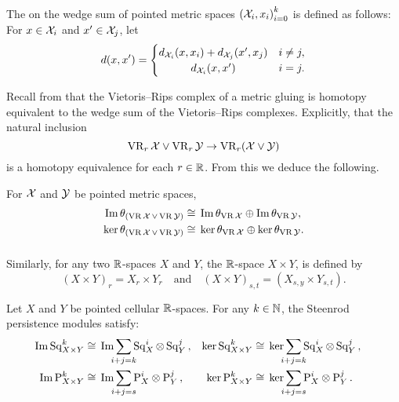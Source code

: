 \subsubsection{}\label{ss:wedge sum}

The  on the wedge sum of pointed metric spaces ${(\mathcal{X}_i, x_i)}_{i = 0}^k$ is defined as follows: For $x \in \mathcal{X}_i$ and $x' \in \mathcal{X}_j$, let
\[
d(x, x') =
\begin{cases}
	d_{\cX_i}(x, x_i) + d_{\cX_j}(x', x_j) & i \neq j, \\
	\hfil d_{\cX_i}(x, x') & i = j.
\end{cases}
\]

Recall from \cite[Proposition 1]{adamaszek2020homotopy} that the Vietoris--Rips complex of a metric gluing is homotopy equivalent to the wedge sum of the Vietoris--Rips complexes.
Explicitly, that the natural inclusion
\[
\operatorname{VR}_r\mathcal{X} \vee \operatorname{VR}_r\mathcal{Y} \to \operatorname{VR}_r(\mathcal{X} \vee \mathcal{Y})
\]
is a homotopy equivalence for each $r \in \mathbb{R}$.
From this we deduce the following.

\medskip\corollary
For $\mathcal{X}$ and $\mathcal{Y}$ be pointed metric spaces,
\begin{align*}
	\operatorname{Im}\theta_{(\operatorname{VR} \mathcal{X} \, \vee \, \operatorname{VR} \mathcal{Y})} &\cong \, \operatorname{Im}\theta_{\operatorname{VR} \mathcal{X}} \oplus \operatorname{Im}\theta_{\operatorname{VR} \mathcal{Y}}, \\
	\ker\theta_{(\operatorname{VR} \mathcal{X} \, \vee \, \operatorname{VR} \mathcal{Y})} &\cong \, \ker\theta_{\operatorname{VR} \mathcal{X}} \oplus \ker\theta_{\operatorname{VR} \mathcal{Y}}.
\end{align*}

\subsubsection{}

Similarly, for any two $\mathbb{R}$-spaces $X$ and $Y$, the $\mathbb{R}$-space $X \times Y$, is defined by
\[
(X \times Y)_r = X_r \times Y_r \quad\text{and}\quad (X \times Y)_{s,t} = (X_{s,y} \times Y_{s,t}).
\]

\theorem
Let $X$ and $Y$ be pointed cellular $\mathbb{R}$-spaces.
For any $k \in \mathbb{N}$, the Steenrod persistence modules satisfy:
\begin{align*}
	\img\Sq^k_{X \times Y} &\cong\, \img\sum_{\mathclap{i+j=k}} \Sq^i_X \ot \Sq^j_Y\,, & \ker\Sq^k_{X \times Y} &\cong\, \ker\sum_{\mathclap{i+j=k}} \Sq^i_X \ot \Sq^j_Y\,, \\
	\img\rP^k_{X \times Y} &\cong\, \img\sum_{\mathclap{i+j=s}} \rP^i_X \otimes \rP^j_Y\,, & 
	\ker\rP^k_{X \times Y} &\cong\, \ker\sum_{\mathclap{i+j=s}} \rP^i_X \otimes \rP^j_Y\,. &
\end{align*}

